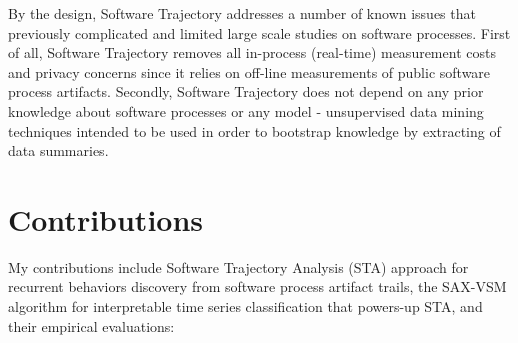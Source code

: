 By the design, Software Trajectory addresses a number of known issues that previously complicated and limited 
large scale studies on software processes.
First of all, Software Trajectory removes all in-process (real-time) measurement costs and privacy concerns since 
it relies on off-line measurements of public software process artifacts. 
Secondly, Software Trajectory does not depend on any prior knowledge about software processes or any model - 
unsupervised data mining techniques intended to be used in order to bootstrap knowledge by extracting of data 
summaries. 


\section{Contributions}\label{section_contributions}
My contributions include Software Trajectory Analysis (STA) approach for recurrent behaviors discovery
from software process artifact trails, the SAX-VSM algorithm for interpretable time series classification 
that powers-up STA, and their empirical evaluations: 

